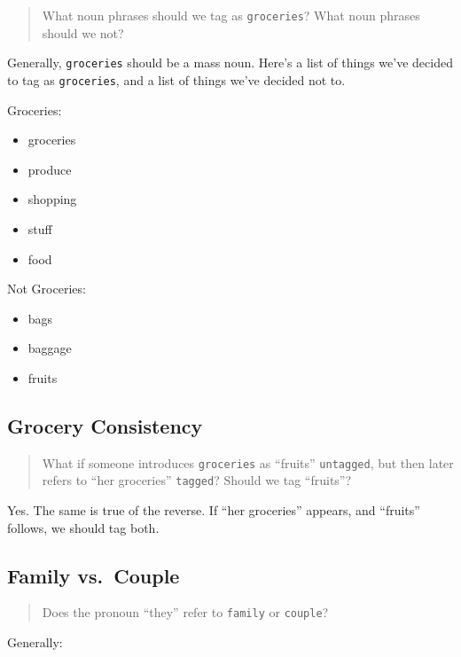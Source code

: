 \documentclass[
]{book}
\providecommand{\tightlist}{%
  \setlength{\itemsep}{0pt}\setlength{\parskip}{0pt}}
\begin{document}
\begin{quote}
What noun phrases should we tag as \texttt{groceries}? What noun phrases should we not?
\end{quote}

Generally, \texttt{groceries} should be a mass noun.
Here's a list of things we've decided to tag as \texttt{groceries}, and a list of things we've decided not to.

Groceries:

\begin{itemize}
\tightlist
\item
  groceries
\item
  produce
\item
  shopping
\item
  stuff
\item
  food
\end{itemize}

Not Groceries:

\begin{itemize}
\tightlist
\item
  bags
\item
  baggage
\item
  fruits
\end{itemize}

\hypertarget{grocery-consistency}{%
\subsection{Grocery Consistency}\label{grocery-consistency}}

\begin{quote}
What if someone introduces \texttt{groceries} as ``fruits'' \texttt{untagged},
but then later refers to ``her groceries'' \texttt{tagged}?
Should we tag ``fruits''?
\end{quote}

Yes. The same is true of the reverse.
If ``her groceries'' appears, and ``fruits'' follows, we should tag both.

\hypertarget{family-vs.-couple}{%
\subsection{Family vs.~Couple}\label{family-vs.-couple}}

\begin{quote}
Does the pronoun ``they'' refer to \texttt{family} or \texttt{couple}?
\end{quote}

Generally:
\end{document}
